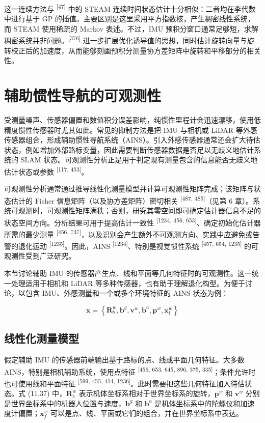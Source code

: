 这一连续方法与 \textsuperscript{[47]} 中的 STEAM 连续时间状态估计十分相似：二者均在李代数中进行基于 GP 的插值。主要区别是这里采用平方指数核，产生稠密线性系统，而 STEAM 使用稀疏的 Markov 表述。不过，IMU 预积分窗口通常足够短，求解稠密系统并非问题。\textsuperscript{[376]} 进一步扩展优化诱导值的思想，同时估计旋转向量与旋转校正后的加速度，从而能够刻画预积分测量协方差矩阵中旋转和平移部分的相关性。

\section{辅助惯性导航的可观测性}

受测量噪声、传感器偏置和数值积分误差影响，纯惯性里程计会迅速漂移，使用低精度惯性传感器时尤其如此。常见的抑制方法是把 IMU 与相机或 LiDAR 等外感传感器组合，形成辅助惯性导航系统（AINS）。引入外感传感器通常还会扩大待估状态，例如增加外部路标变量，因此需要判断传感器数据是否足以无歧义地估计系统的 SLAM 状态。可观测性分析正是用于判定现有测量包含的信息能否无歧义地估计状态或参数 \textsuperscript{[117, 453]}。

可观测性分析通常通过推导线性化测量模型并计算可观测性矩阵完成；该矩阵与状态估计的 Fisher 信息矩阵（以及协方差矩阵）密切相关 \textsuperscript{[487, 485]}（见第 6 章）。系统可观测时，可观测性矩阵满秩；否则，研究其零空间即可确定估计器信息不足的状态空间方向。分析结果可用于提高估计一致性 \textsuperscript{[1234, 456, 653]}、确定初始化估计器所需的最少测量 \textsuperscript{[456, 737]}，以及识别会产生额外不可观测方向、实践中应避免或告警的退化运动 \textsuperscript{[1235]}。因此，AINS \textsuperscript{[1234]}、特别是视觉惯性系统 \textsuperscript{[457, 654, 1235]} 的可观测性受到广泛研究。

本节讨论辅助 IMU 的传感器产生点、线和平面等几何特征时的可观测性。这一统一处理适用于相机和 LiDAR 等多种传感器，也有助于理解退化构型。为便于讨论，以包含 IMU、外感测量和一个或多个环境特征的 AINS 状态为例：

\begin{equation}
\boldsymbol {x} = \left\{\boldsymbol {R} _ {b} ^ {w}, \mathbf {b} ^ {g}, \boldsymbol {v} ^ {w}, \mathbf {b} ^ {a}, \boldsymbol {p} ^ {w}, \boldsymbol {x} _ {\mathrm{f}} ^ {w} \right\}\tag{11.37}
\end{equation}

\subsection{线性化测量模型}

假定辅助 IMU 的传感器前端输出基于路标的点、线或平面几何特征。大多数 AINS，特别是相机辅助系统，使用点特征 \textsuperscript{[456, 653, 645, 896, 375, 335]}；条件允许时也可使用线和平面特征 \textsuperscript{[599, 455, 414, 1236]}。此时需要把这些几何特征加入待估状态。式 (11.37) 中，$\boldsymbol R_b^w$ 表示机体坐标系相对于世界坐标系的旋转，$\boldsymbol p^w$ 和 $\boldsymbol v^w$ 分别是世界坐标系中的机器人位置与速度，$\mathbf b^g$ 和 $\mathbf b^a$ 是机体坐标系中的陀螺仪和加速度计偏置；$\boldsymbol x_f^w$ 可以是点、线、平面或它们的组合，并在世界坐标系中表达。

